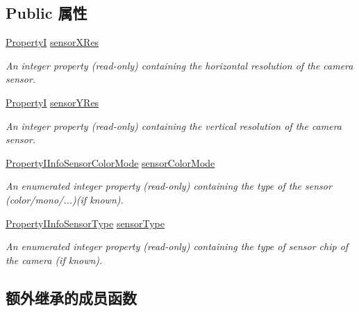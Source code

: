 \subsection*{Public 属性}
\begin{DoxyCompactItemize}
\item 
\hyperlink{group___common_interface_ga12d5e434238ca242a1ba4c6c3ea45780}{Property\+I} \hyperlink{classmv_i_m_p_a_c_t_1_1acquire_1_1_info_blue_device_a566ec34434c15f5a04cab7b8c16cda94}{sensor\+X\+Res}
\begin{DoxyCompactList}\small\item\em An integer property {\bfseries }(read-\/only) containing the horizontal resolution of the camera sensor. \end{DoxyCompactList}\item 
\hyperlink{group___common_interface_ga12d5e434238ca242a1ba4c6c3ea45780}{Property\+I} \hyperlink{classmv_i_m_p_a_c_t_1_1acquire_1_1_info_blue_device_ade697938bd71524589e433abe30a39d9}{sensor\+Y\+Res}
\begin{DoxyCompactList}\small\item\em An integer property {\bfseries }(read-\/only) containing the vertical resolution of the camera sensor. \end{DoxyCompactList}\item 
\hyperlink{group___device_specific_interface_gaf05019cc6b863ccf692d8705e7ae6c57}{Property\+I\+Info\+Sensor\+Color\+Mode} \hyperlink{classmv_i_m_p_a_c_t_1_1acquire_1_1_info_blue_device_ac6da6693f0d2cc7f9e7b0967382b0aca}{sensor\+Color\+Mode}
\begin{DoxyCompactList}\small\item\em An enumerated integer property {\bfseries }(read-\/only) containing the type of the sensor (color/mono/...)(if known). \end{DoxyCompactList}\item 
\hyperlink{group___device_specific_interface_ga071d509608754cf5b0d258cc0ac39726}{Property\+I\+Info\+Sensor\+Type} \hyperlink{classmv_i_m_p_a_c_t_1_1acquire_1_1_info_blue_device_a6936345cc2e2d0b638e50bfc6eaf7271}{sensor\+Type}
\begin{DoxyCompactList}\small\item\em An enumerated integer property {\bfseries }(read-\/only) containing the type of sensor chip of the camera (if known). \end{DoxyCompactList}\end{DoxyCompactItemize}
\subsection*{额外继承的成员函数}


